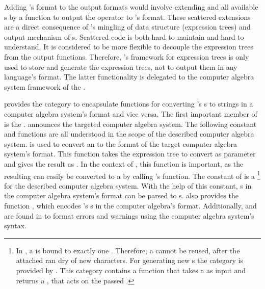 Adding \Mathematica's format to the output formats would involve extending  and all available s by a function to output the operator to \Mathematica's format. 
These scattered extensions are a direct consequence of \LibAlgebra's mingling of data structure (expression trees) and output mechanism of s. Scattered code is both hard to maintain and hard to understand. It is considered to be more flexible to decouple the expression trees from the output functions. Therefore, \LibAlgebra's framework for expression trees is only used to store and generate the expression trees, not to output them in any language's format. The latter functionality is delegated to the computer algebra system framework of the \LibExtIO.

\LibExtIO provides the category \adthistype to encapsulate functions for converting \LibAlgebra's s to strings in a computer algebra system's format and vice versa. The first important member of \adthistype is the  .  announces the targeted computer algebra system. The following constant and functions are all understood in the scope of the described computer algebra system.  is used to convert an  to the format of the target computer algebra system's format. This function takes the expression tree to convert as parameter and gives the result as . In the context of , this function is important, as the resulting  can easily be converted to a  by calling 's  function. The constant  of \adthistype is a \footnote{In \LibAlgebra, a  is bound to exactly one . Therefore, a  cannot be reused, after the attached  ran dry of new characters. For generating new s the category  is provided by \LibAlgebra. This category contains a function  that takes a  as input and returns a , that acts on the passed .} for the described computer algebra system. With the help of this constant, s in the computer algebra system's format can be parsed to s. \adthistype also provides the function , which encodes \Aldor's s in the computer algebra's format. Additionally,  and  are found in \adthistype to format errors and warnings using the computer algebra system's syntax.

